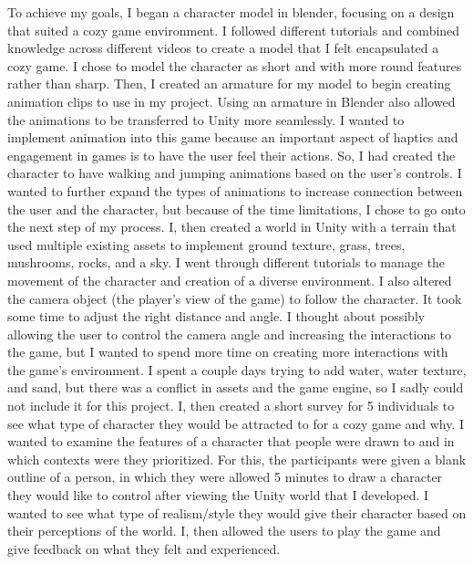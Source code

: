 \documentclass[10pt,twocolumn]{article}
\begin{document}
To achieve my goals, I began a character model in blender, focusing on a design that suited a cozy game environment. I followed different tutorials and combined knowledge across different videos to create a model that I felt encapsulated a cozy game. I chose to model the character as short and with more round features rather than sharp. Then, I created an armature for my model to begin creating animation clips to use in my project. Using an armature in Blender also allowed the animations to be transferred to Unity more seamlessly. I wanted to implement animation into this game because an important aspect of haptics and engagement in games is to have the user feel their actions. So, I had created the character to have walking and jumping animations based on the user's controls. I wanted to further expand the types of animations to increase connection between the user and the character, but because of the time limitations, I chose to go onto the next step of my process. I, then created a world in Unity with a terrain that used multiple existing assets to implement ground texture, grass, trees, mushrooms, rocks, and a sky. I went through different tutorials to manage the movement of the character and creation of a diverse environment. I also altered the camera object (the player's view of the game) to follow the character. It took some time to adjust the right distance and angle. I thought about possibly allowing the user to control the camera angle and increasing the interactions to the game, but I wanted to spend more time on creating more interactions with the game's environment. I spent a couple days trying to add water, water texture, and sand, but there was a conflict in assets and the game engine, so I sadly could not include it for this project. I, then created a short survey for 5 individuals to see what type of character they would be attracted to for a cozy game and why. I wanted to examine the features of a character that people were drawn to and in which contexts were they prioritized. For this, the participants were given a blank outline of a person, in which they were allowed 5 minutes to draw a character they would like to control after viewing the Unity world that I developed. I wanted to see what type of realism/style they would give their character based on their perceptions of the world. I, then allowed the users to play the game and give feedback on what they felt and experienced.
\end{document}
